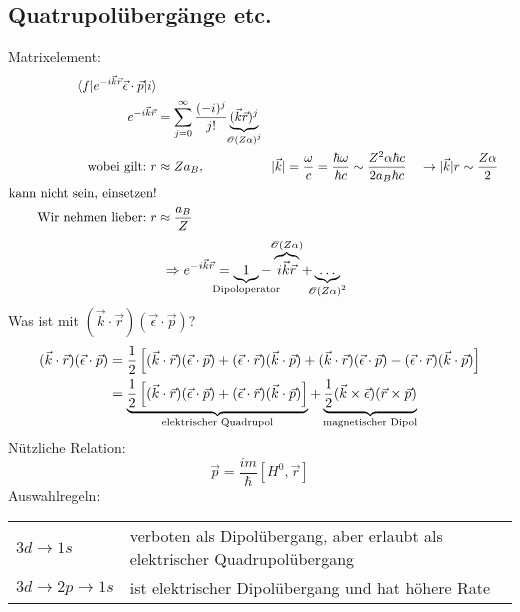 \subsection{Quatrupolübergänge etc.}
	Matrixelement:
		\begin{align*}
			\braket{f | e^{-i \vec{k} \vec{r}} \vec{\epsilon} \cdot \vec{p} | i} \\
			e^{-i \vec{k} \vec{r}} &= 
			\sum_{j = 0}^{\infty} \frac{(-i)^j}{j!} 
			\underbrace{(\vec{k} \vec{r})^j}_{\mathclap{\mathscr{O} (Z \alpha)^j}} \\
			\text{wobei gilt:~} r &\approx Z a_B ,&
			|\vec{k}| &= \frac{\omega}{c} = \frac{\hbar \omega}{\hbar c} 
			\sim \frac{Z^2 \alpha \hbar c}{2 a_B \hbar c} 
			& &\rightarrow |\vec{k}| r \sim \frac{Z \alpha}{2} \\
			\text{kann nicht sein, einsetzen!}\\
			\text{Wir nehmen lieber:~} r &\approx \frac{a_B}{Z}
		\end{align*} 
		\begin{align*}
			\Rightarrow e^{-i \vec{k} \vec{r}} &=
			\underbrace{1}_{\mathclap{\text{Dipoloperator}}}
			- \overbrace{i \vec{k} \vec{r}}^{\mathclap{\mathscr{O} (Z \alpha)}}
			+ \underbrace{\ldots}_{\mathclap{\mathscr{O} (Z\alpha)^2}}
		\end{align*}
	Was ist mit $(\vec{k} \cdot \vec{r})(\vec{\epsilon} \cdot \vec{p})$?
		\begin{align*}
			(\vec{k} \cdot \vec{r})(\vec{\epsilon} \cdot \vec{p}) &=
			\frac{1}{2} \left[
				(\vec{k} \cdot \vec{r})(\vec{\epsilon} \cdot \vec{p})
				+ (\vec{\epsilon} \cdot \vec{r})(\vec{k} \cdot \vec{p})
				+ (\vec{k} \cdot \vec{r})(\vec{\epsilon} \cdot \vec{p})
				- (\vec{\epsilon} \cdot \vec{r})(\vec{k} \cdot \vec{p})
			\right] \\
			&= \underbrace{\frac{1}{2} \left[
				(\vec{k} \cdot \vec{r})(\vec{\epsilon} \cdot \vec{p})
				+ (\vec{\epsilon} \cdot \vec{r})(\vec{k} \cdot \vec{p})
			\right]}_{\mathclap{\text{elektrischer Quadrupol}}}
			+ \underbrace{\frac{1}{2} 
			(\vec{k} \times \vec{\epsilon})(\vec{r} \times \vec{p})}_{\mathclap{\text{magnetischer Dipol}}}
		\end{align*}
	Nützliche Relation: 
		\begin{equation*}
			\vec{p} = \frac{im}{\hbar} [H^0, \vec{r}]
		\end{equation*}
	Auswahlregeln:
	
	\begin{tabular}{l l} 
		$3d \rightarrow 1s$ & verboten als Dipolübergang, aber erlaubt als elektrischer Quadrupolübergang \\
		$3d \rightarrow 2p \rightarrow 1s$ & ist elektrischer Dipolübergang und hat höhere Rate
	\end{tabular}